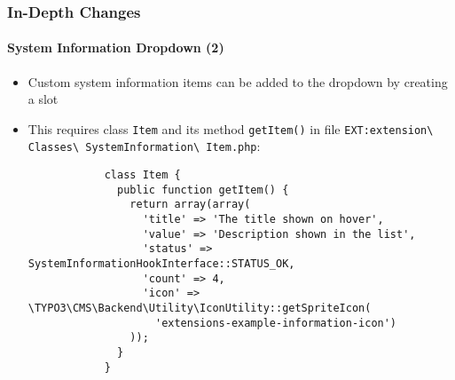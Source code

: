 \begin{frame}[fragile]
	\frametitle{In-Depth Changes}
	\framesubtitle{System Information Dropdown (2)}

	\lstset{basicstyle=\tiny\ttfamily}

	\begin{itemize}

		\item Custom system information items can be added to the dropdown by creating a slot

		\item This requires class \texttt{Item} and its method \texttt{getItem()} in file
			\small
				\texttt{EXT:extension\textbackslash
					Classes\textbackslash
					SystemInformation\textbackslash
					Item.php}:
			\normalsize

		\begin{lstlisting}
			class Item {
			  public function getItem() {
			    return array(array(
			      'title' => 'The title shown on hover',
			      'value' => 'Description shown in the list',
			      'status' => SystemInformationHookInterface::STATUS_OK,
			      'count' => 4,
			      'icon' => \TYPO3\CMS\Backend\Utility\IconUtility::getSpriteIcon(
				    'extensions-example-information-icon')
			    ));
			  }
			}
		\end{lstlisting}

	\end{itemize}

\end{frame}

